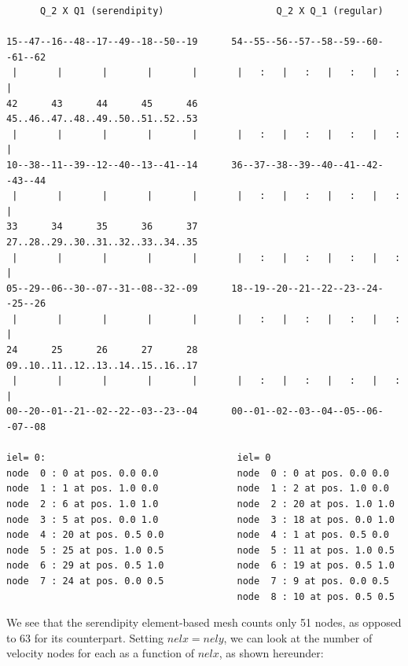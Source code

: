 \begin{verbatim}
      Q_2 X Q1 (serendipity)                    Q_2 X Q_1 (regular)

15--47--16--48--17--49--18--50--19      54--55--56--57--58--59--60--61--62
 |       |       |       |       |       |   :   |   :   |   :   |   :   |
42      43      44      45      46      45..46..47..48..49..50..51..52..53
 |       |       |       |       |       |   :   |   :   |   :   |   :   |
10--38--11--39--12--40--13--41--14      36--37--38--39--40--41--42--43--44
 |       |       |       |       |       |   :   |   :   |   :   |   :   |
33      34      35      36      37      27..28..29..30..31..32..33..34..35
 |       |       |       |       |       |   :   |   :   |   :   |   :   |
05--29--06--30--07--31--08--32--09      18--19--20--21--22--23--24--25--26
 |       |       |       |       |       |   :   |   :   |   :   |   :   |
24      25      26      27      28      09..10..11..12..13..14..15..16..17
 |       |       |       |       |       |   :   |   :   |   :   |   :   |
00--20--01--21--02--22--03--23--04      00--01--02--03--04--05--06--07--08

iel= 0:                                  iel= 0
node  0 : 0 at pos. 0.0 0.0              node  0 : 0 at pos. 0.0 0.0
node  1 : 1 at pos. 1.0 0.0              node  1 : 2 at pos. 1.0 0.0
node  2 : 6 at pos. 1.0 1.0              node  2 : 20 at pos. 1.0 1.0
node  3 : 5 at pos. 0.0 1.0              node  3 : 18 at pos. 0.0 1.0
node  4 : 20 at pos. 0.5 0.0             node  4 : 1 at pos. 0.5 0.0
node  5 : 25 at pos. 1.0 0.5             node  5 : 11 at pos. 1.0 0.5
node  6 : 29 at pos. 0.5 1.0             node  6 : 19 at pos. 0.5 1.0
node  7 : 24 at pos. 0.0 0.5             node  7 : 9 at pos. 0.0 0.5
                                         node  8 : 10 at pos. 0.5 0.5
\end{verbatim}

We see that the serendipity element-based mesh counts only 51 nodes, as
opposed to 63 for its counterpart.
Setting $nelx=nely$, we can look at the number of velocity nodes for each 
as a function of $nelx$, as shown hereunder:

